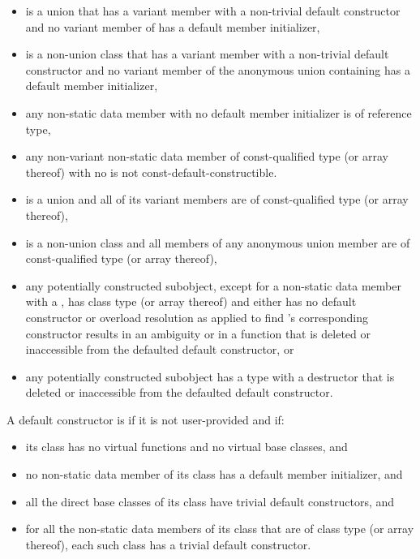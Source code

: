 \begin{itemize}
\item {} is a union that has a variant member
with a non-trivial default constructor and
no variant member of  has a default member initializer,

\item {} is a non-union class that has a variant member 
with a non-trivial default constructor and
no variant member of the anonymous union containing 
has a default member initializer,

\item any non-static data member with no default member initializer is
of reference type,

\item any non-variant non-static data member of const-qualified type (or array
thereof) with no 
is not const-default-constructible.

\item {} is a union and all of its variant members are of const-qualified
type (or array thereof),

\item {} is a non-union class and all members of any anonymous union member are
of const-qualified type (or array thereof),

\item any potentially constructed subobject, except for a non-static data member
with a , has
class type  (or array thereof) and either 
has no default constructor or overload resolution
as applied to find 's corresponding
constructor results in an ambiguity or in a function that is deleted or
inaccessible from the defaulted default constructor, or

\item any potentially constructed subobject has a type
with a destructor that is deleted or inaccessible from the defaulted default
constructor.
\end{itemize}

\pnum
A default constructor is
if it is not user-provided and if:

\begin{itemize}
\item
its class has no virtual functions and no virtual base
classes, and

\item no non-static data member of its class has
a default member initializer, and

\item
all the direct base classes of its class have trivial default constructors, and

\item
for all the non-static data members of its class that are of class
type (or array thereof), each such class has a trivial default constructor.
\end{itemize}

